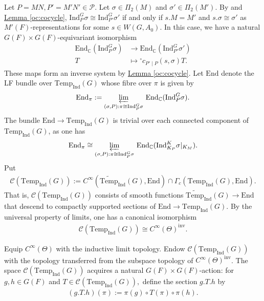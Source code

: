 \documentclass[10pt]{amsart}
\theoremstyle{definition}
\numberwithin{equation}{section}
\numberwithin{equation}{subsection}
\newcommand{\Ind}{\mathrm{Ind}}
\newcommand{\CC}{\mathbb{C}}
\newcommand{\Temp}{\mathrm{Temp}}
\begin{document}
Let $P=MN, P'=M'N'\in \mathcal{P}.$ Let $\sigma\in \Pi_2(M)$ and $\sigma'\in \Pi_2(M').$ By \cite[Th\'eor\`eme VII.2.6]{Representation-p-adic} and  \hyperref[oc:cocycle]{Lemma \ref{oc:cocycle}}, $\Ind_P^G\sigma\cong \Ind_{P'}^G{\sigma'}$ if and only if $s.M = M'$ and $s.\sigma \cong \sigma'$ as $M'(F)$-representations for some $s\in W(G,A_0)$. In this case, we have a natural $G(F)\times G(F)$-equivariant isomorphism
\begin{align*}
    \mathrm{End}_\CC(\Ind_P^G\sigma)&\longrightarrow \mathrm{End}_\CC(\Ind_{P'}^G\sigma')\\
    T&\longmapsto  {}^\circ c_{P'\mid P}(s,\sigma)T.
\end{align*}
These maps form an inverse system by \hyperref[oc:cocycle]{Lemma \ref{oc:cocycle}}. Let $\mathrm{End}$ denote the LF bundle over $\Temp_\Ind(G)$ whose fibre over $\pi$ is given by 
\begin{align*}
    \mathrm{End}_\pi := \varprojlim_{(\sigma,P):\pi\cong \Ind_P^G\sigma}\,\mathrm{End}_\CC(\Ind_P^G\sigma).
\end{align*}
The bundle $\mathrm{End}\to\Temp_\Ind(G)$ is trivial over each connected component of $\Temp_\Ind(G)$, as one has
\begin{align*}
    \mathrm{End}_\pi \cong \varprojlim_{(\sigma,P):\pi\cong \Ind_P^G\sigma}\,\mathrm{End}_\CC(\Ind_{K_P}^K\sigma\vert_{K_M}).
\end{align*}
Put
\begin{align*}
    \mathcal{C}(\Temp_\Ind(G)) := C^\infty(\widetilde{\Temp}_{\Ind}(G),\mathrm{End}) \cap \Gamma_c(\Temp_\Ind(G),\mathrm{End}).
\end{align*}
That is, $\mathcal{C}(\Temp_\Ind(G))$ consists of smooth functions  $\widetilde{\Temp}_{\Ind}(G)\to \mathrm{End}$ that descend to compactly supported sections of $\mathrm{End}\to \Temp_\Ind(G)$. By the universal property of limits, one has a canonical isomorphism
\begin{align*}
    \mathcal{C}(\Temp_\Ind(G)) \cong C^\infty(\Theta)^{\mathrm{inv}}.
\end{align*}

Equip $C^\infty(\Theta)$ with the inductive limit topology. Endow $\mathcal{C}(\Temp_\Ind(G))$ with the topology transferred from the subspace topology of $C^\infty(\Theta)^{\mathrm{inv}}$. The space $\mathcal{C}(\Temp_\Ind(G))$ acquires a natural $G(F)\times G(F)$-action: for $g,h\in G(F)$ and $T\in \mathcal{C}(\Temp_\Ind(G)),$ define the section $g.T.h$ by
\begin{align*}
    (g.T.h)(\pi):=\pi(g)\circ T(\pi)\circ \pi(h).
\end{align*}
\end{document}

